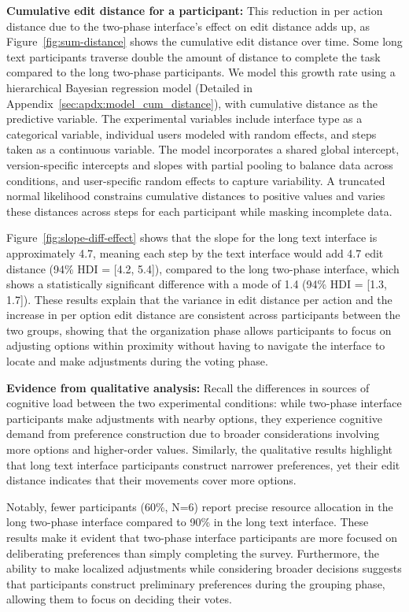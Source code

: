 \textbf{Cumulative edit distance for a participant:} This reduction in per action distance due to the two-phase interface's effect on edit distance adds up, as Figure~\ref{fig:sum-distance} shows the cumulative edit distance over time. Some long text participants traverse double the amount of distance to complete the task compared to the long two-phase participants. We model this growth rate using a hierarchical Bayesian regression model (Detailed in Appendix~\ref{sec:apdx:model_cum_distance}), with cumulative distance as the predictive variable. The experimental variables include interface type as a categorical variable, individual users modeled with random effects, and steps taken as a continuous variable. The model incorporates a shared global intercept, version-specific intercepts and slopes with partial pooling to balance data across conditions, and user-specific random effects to capture variability. A truncated normal likelihood constrains cumulative distances to positive values and varies these distances across steps for each participant while masking incomplete data.

Figure~\ref{fig:slope-diff-effect} shows that the slope for the long text interface is approximately 4.7, meaning each step by the text interface would add 4.7 edit distance (94\% HDI = [4.2, 5.4]), compared to the long two-phase interface, which shows a statistically significant difference with a mode of 1.4 (94\% HDI = [1.3, 1.7]). These results explain that the variance in edit distance per action and the increase in per option edit distance are consistent across participants between the two groups, showing that the organization phase allows participants to focus on adjusting options within proximity without having to navigate the interface to locate and make adjustments during the voting phase.

\textbf{Evidence from qualitative analysis:} Recall the differences in sources of cognitive load between the two experimental conditions: while two-phase interface participants make adjustments with nearby options, they experience cognitive demand from preference construction due to broader considerations involving more options and higher-order values. Similarly, the qualitative results highlight that long text interface participants construct narrower preferences, yet their edit distance indicates that their movements cover more options.

Notably, fewer participants (60\%, N=6) report precise resource allocation in the long two-phase interface compared to 90\% in the long text interface. These results make it evident that two-phase interface participants are more focused on deliberating preferences than simply completing the survey. Furthermore, the ability to make localized adjustments while considering broader decisions suggests that participants construct preliminary preferences during the grouping phase, allowing them to focus on deciding their votes.

